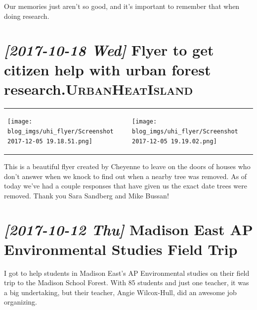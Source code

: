 \documentclass{article}
\begin{document}
Our memories just aren't so good, and it's important to remember that
when doing research.

\section*{\textit{[2017-10-18 Wed] } Flyer to get citizen help with urban forest research.\hfill{}\textsc{UrbanHeatIsland}}
\label{sec:org67407d4}

\begin{center}
\begin{tabular}{ll}
\begin{center}
\texttt{[image: blog\_imgs/uhi\_flyer/Screenshot 2017-12-05 19.18.51.png]}
\end{center} & \begin{center}
\texttt{[image: blog\_imgs/uhi\_flyer/Screenshot 2017-12-05 19.19.02.png]}
\end{center}\\
\end{tabular}
\end{center}

This is a beautiful flyer created by Cheyenne to leave on the doors of
houses who don't answer when we knock to find out when a nearby tree
was removed.  As of today we've had a couple responses that have given
us the exact date trees were removed.  Thank you Sara Sandberg and
Mike Bussan!

\section*{\textit{[2017-10-12 Thu] } Madison East AP Environmental Studies Field Trip}
\label{sec:org7fc27aa}

I got to help students in Madison East's AP Environmental studies on
their field trip to the Madison School Forest.  With 85 students and
just one teacher, it was a big undertaking, but their teacher, Angie
Wilcox-Hull, did an awesome job organizing.
\end{document}
